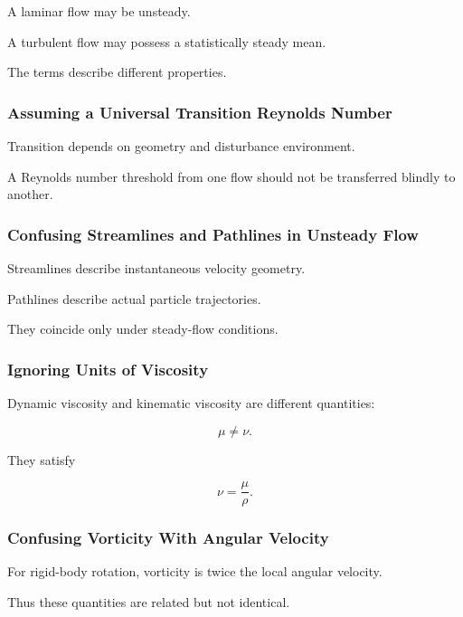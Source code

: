 A laminar flow may be unsteady.

A turbulent flow may possess a statistically steady mean.

The terms describe different properties.

\subsubsection{Assuming a Universal Transition Reynolds Number}

Transition depends on geometry and disturbance environment.

A Reynolds number threshold from one flow should not be transferred blindly
to another.

\subsubsection{Confusing Streamlines and Pathlines in Unsteady Flow}

Streamlines describe instantaneous velocity geometry.

Pathlines describe actual particle trajectories.

They coincide only under steady-flow conditions.

\subsubsection{Ignoring Units of Viscosity}

Dynamic viscosity and kinematic viscosity are different quantities:

\[
\mu
\neq
\nu.
\]

They satisfy

\[
\nu=\frac{\mu}{\rho}.
\]

\subsubsection{Confusing Vorticity With Angular Velocity}

For rigid-body rotation, vorticity is twice the local angular velocity.

Thus these quantities are related but not identical.

